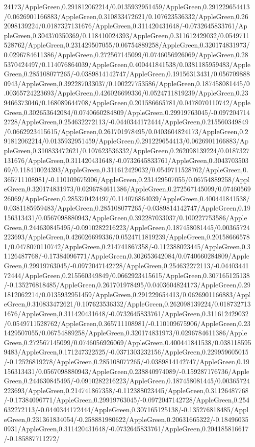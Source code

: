 {\begin{tikzternal}
{24173/AppleGreen,0.291812062214/0.0135932951459/AppleGreen,0.291229654413/0.0626901166883/AppleGreen,0.310833472621/0.107623536332/AppleGreen,0.262098139224/0.0187327131676/AppleGreen,0.311420431648/-0.0732645833761/AppleGreen,0.304370350369/0.118410024393/AppleGreen,0.311612429032/0.0549711528762/AppleGreen,0.231429507055/0.06754889258/AppleGreen,0.320174831973/0.0296784611386/AppleGreen,0.272567145099/0.0746056926069/AppleGreen,0.285370424497/0.114076864039/AppleGreen,0.400441841538/0.0381185959483/AppleGreen,0.285108077265/-0.0389814142747/AppleGreen,0.19156313431/0.0567098880943/AppleGreen,0.392287033037/0.100227753586/AppleGreen,0.187458081445/0.00365724223693/AppleGreen,0.426026699336/0.0524711819239/AppleGreen,0.239466373046/0.168089644708/AppleGreen,0.201586665781/0.0478070110742/AppleGreen,0.302653642084/0.0740660284809/AppleGreen,0.29919763045/-0.0972047142728/AppleGreen,0.254632272113/-0.0440344172444/AppleGreen,0.215560349849/0.0662923415615/AppleGreen,0.261701978495/0.0403604824173/AppleGreen,0.291812062214/0.0135932951459/AppleGreen,0.291229654413/0.0626901166883/AppleGreen,0.310833472621/0.107623536332/AppleGreen,0.262098139224/0.0187327131676/AppleGreen,0.311420431648/-0.0732645833761/AppleGreen,0.304370350369/0.118410024393/AppleGreen,0.311612429032/0.0549711528762/AppleGreen,0.365711108981/-0.110109675906/AppleGreen,0.231429507055/0.06754889258/AppleGreen,0.320174831973/0.0296784611386/AppleGreen,0.272567145099/0.0746056926069/AppleGreen,0.285370424497/0.114076864039/AppleGreen,0.400441841538/0.0381185959483/AppleGreen,0.285108077265/-0.0389814142747/AppleGreen,0.19156313431/0.0567098880943/AppleGreen,0.392287033037/0.100227753586/AppleGreen,0.244630845495/-0.0910282216223/AppleGreen,0.187458081445/0.00365724223693/AppleGreen,0.426026699336/0.0524711819239/AppleGreen,0.201586665781/0.0478070110742/AppleGreen,0.214741867358/-0.112388023445/AppleGreen,0.31126487768/-0.17384096771/AppleGreen,0.302653642084/0.0740660284809/AppleGreen,0.29919763045/-0.0972047142728/AppleGreen,0.254632272113/-0.0440344172444/AppleGreen,0.215560349849/0.0662923415615/AppleGreen,0.307165125138/-0.135276818485/AppleGreen,0.261701978495/0.0403604824173/AppleGreen,0.291812062214/0.0135932951459/AppleGreen,0.291229654413/0.0626901166883/AppleGreen,0.310833472621/0.107623536332/AppleGreen,0.262098139224/0.0187327131676/AppleGreen,0.311420431648/-0.0732645833761/AppleGreen,0.311612429032/0.0549711528762/AppleGreen,0.365711108981/-0.110109675906/AppleGreen,0.231429507055/0.06754889258/AppleGreen,0.320174831973/0.0296784611386/AppleGreen,0.272567145099/0.0746056926069/AppleGreen,0.400441841538/0.0381185959483/AppleGreen,0.171247322525/-0.0371303232156/AppleGreen,0.229959605015/-0.12526819278/AppleGreen,0.285108077265/-0.0389814142747/AppleGreen,0.19156313431/0.0567098880943/AppleGreen,0.238840974089/-0.159287176736/AppleGreen,0.244630845495/-0.0910282216223/AppleGreen,0.187458081445/0.00365724223693/AppleGreen,0.214741867358/-0.112388023445/AppleGreen,0.31126487768/-0.17384096771/AppleGreen,0.29919763045/-0.0972047142728/AppleGreen,0.254632272113/-0.0440344172444/AppleGreen,0.307165125138/-0.135276818485/AppleGreen,0.231361834054/-0.258881980622/AppleGreen,0.20631665322/-0.184960350931/AppleGreen,0.311420431648/-0.0732645833761/AppleGreen,0.204185816617/-0.185887711272/}
\end{tikzternal}}

